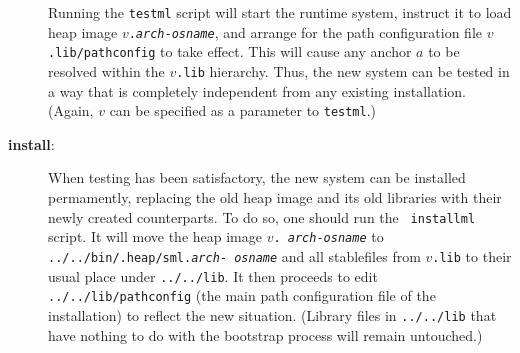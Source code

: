 \begin{description}
Running the {\tt testml} script will start the runtime system,
instruct it to load heap image {\tt $v$.{\it arch}-{\it osname}},
and arrange for the path configuration file {\tt $v$.lib/pathconfig}
to take effect.  This will cause any anchor $a$ to be resolved within
the {\tt $v$.lib} hierarchy.  Thus, the new system can be tested in a
way that is completely independent from any existing installation.
(Again, $v$ can be specified as a parameter to {\tt testml}.)
\item[{\bf install}:]
When testing has been satisfactory, the new system can be installed
permamently, replacing the old heap image and its old libraries with
their newly created counterparts.  To do so, one should run the {\tt
installml} script.  It will move the heap image {\tt $v$.{\it
arch}-{\it osname}} to {\tt ../../bin/.heap/sml.{\it arch}-{\it
osname}} and all stablefiles from {\tt $v$.lib} to their usual place
under {\tt ../../lib}.  It then proceeds to edit
{\tt ../../lib/pathconfig} (the main path configuration file of the
installation) to reflect the new situation.
(Library files in {\tt ../../lib} that have nothing to do with the
bootstrap process will remain untouched.)
\end{description}
